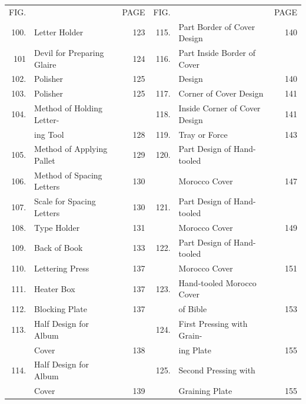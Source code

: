 \documentclass[twoside]{book}
\begin{document}
\begin{tiny}
\begin{tabular}{r l r r l r }
FIG. &                                      & PAGE  & FIG. &                                         & PAGE \\
100. & Letter Holder               \dotfill &   123 & 115. & Part Border of Cover Design  \dotfill & 140 \\
101  & Devil for Preparing Glaire  \dotfill &   124 & 116. & Part Inside Border of Cover             &     \\
102. & Polisher                    \dotfill &   125 &      & Design                         \dotfill & 140 \\
103. & Polisher                    \dotfill &   125 & 117. & Corner of Cover Design         \dotfill & 141 \\
104. & Method of Holding Letter-            &       & 118. & Inside Corner of Cover Design  \dotfill & 141 \\
     & ing Tool                    \dotfill &   128 & 119. & Tray or Force                  \dotfill & 143 \\
105. & Method of Applying Pallet   \dotfill &   129 & 120. & Part Design of Hand-tooled              &     \\
106. & Method of Spacing Letters   \dotfill &   130 &      & Morocco Cover                  \dotfill & 147 \\
107. & Scale for Spacing Letters   \dotfill &   130 & 121. & Part Design of Hand-tooled              &     \\
108. & Type Holder                 \dotfill &   131 &      & Morocco Cover                  \dotfill & 149 \\
109. & Back of Book                \dotfill &   133 & 122. & Part Design of Hand-tooled              &     \\
110. & Lettering Press             \dotfill &   137 &      & Morocco Cover                  \dotfill & 151 \\
111. & Heater Box                  \dotfill &   137 & 123. & Hand-tooled Morocco Cover               &     \\
112. & Blocking Plate              \dotfill &   137 &      & of Bible                       \dotfill & 153 \\
113. & Half Design for Album                &       & 124. & First Pressing with Grain-              &     \\
     & Cover                       \dotfill &   138 &      & ing Plate                      \dotfill & 155 \\
114. & Half Design for Album       \dotfill &       & 125. & Second Pressing with                    &     \\
     & Cover                       \dotfill &   139 &      & Graining Plate                 \dotfill & 155 \\

\end{tabular}

\end{tiny}
\end{document}
